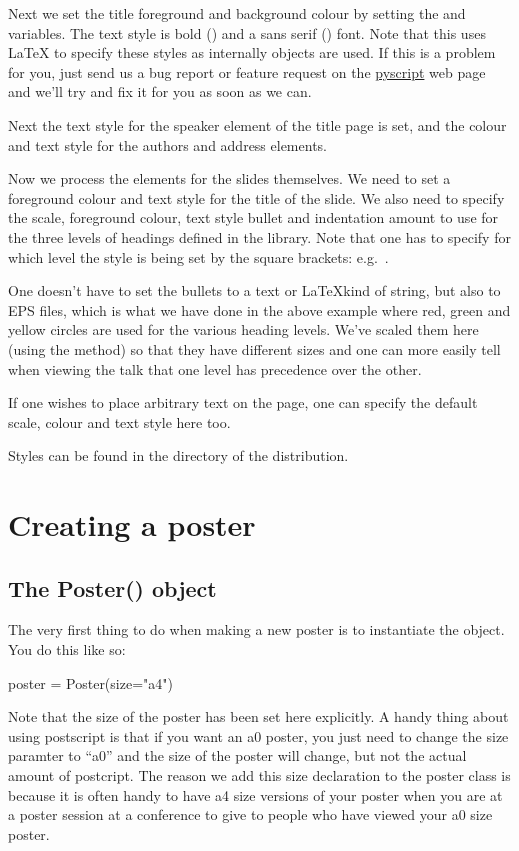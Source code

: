 Next we set the title foreground and background colour by setting the
 and  variables.  The text style is bold
(\ttt{\\bf}) and a sans serif (\ttt{\\sf}) font.  Note that this uses
\LaTeX{} to specify these styles as internally \pyscript {} objects
are used.  If this is a problem for you, just send us a bug report or
feature request on the \href{http://pyscript.sf.net}{pyscript} web page and
we'll try and fix it for you as soon as we can.

Next the text style for the speaker element of the title page is set, and
the colour and text style for the authors and address elements.

Now we process the elements for the slides themselves.  We need to set a
foreground colour and text style for the title of the slide.  We also need
to specify the scale, foreground colour, text style bullet and indentation
amount to use for the three levels of headings defined in the
 library.  Note that one has to specify for which level
the style is being set by the square brackets: e.g.~.  

One doesn't have to set the bullets to a text or \LaTeX kind of string, but
also to EPS files, which is what we have done in the above example where
red, green and yellow circles are used for the various heading levels.
We've scaled them here (using the \pyscript {} method) so that they
have different sizes and one can more easily tell when viewing the talk that
one level has precedence over the other.

If one wishes to place arbitrary text on the page, one can specify the
default scale, colour and text style here too.

Styles can be found in the  directory of the \pyscript
distribution.

\section{Creating a poster}

\subsection{The Poster() object}

The very first thing to do when making a new poster is to instantiate the
 object.  You do this like so:
\begin{python}
poster = Poster(size="a4")
\end{python}
Note that the size of the poster has been set here explicitly.  A handy
thing about using postscript is that if you want an a0 poster, you just need
to change the size paramter to ``a0'' and the size of the poster will
change, but not the actual amount of postcript.  The reason we add this size
declaration to the poster class is because it is often handy to have a4 size
versions of your poster when you are at a poster session at a conference to
give to people who have viewed your a0 size poster.

